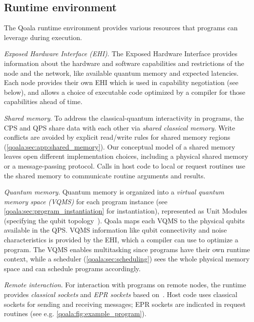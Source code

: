 \subsection{Runtime environment}
\label{qoala:sec:runtime_environment}
The Qoala runtime environment provides various resources that programs can leverage during execution.

\textit{Exposed Hardware Interface (EHI)}.
The Exposed Hardware Interface provides information about the hardware and software capabilities and restrictions of the node and the network,
like available quantum memory and expected latencies.
Each node provides their own EHI which is used in capability negotiation (see below), and allows a choice of executable code optimized by a compiler for those capabilities ahead of time. 

\textit{Shared memory}.
To address the classical-quantum interactivity in programs, the CPS and QPS share data with each other via \textit{shared classical memory}.
Write conflicts are avoided by explicit read/write rules for shared memory regions (\cref{qoala:sec:app:shared_memory}).
Our conceptual model of a shared memory leaves open different implementation choices, including a physical shared memory or a message-passing protocol.
Calls in host code to local or request routines use the shared memory to communicate routine arguments and results.

\textit{Quantum memory}.
Quantum memory is organized into a \textit{virtual quantum memory space (VQMS)} for each program instance (see \cref{qoala:sec:program_instantiation} for instantiation), represented as Unit Modules (specifying the qubit topology~\cite{dahlberg2022netqasm}).
Qoala maps each VQMS to the physical qubits available in the QPS.
VQMS information like qubit connectivity and noise characteristics is provided by the EHI, which a compiler can use to optimize a program.
The VQMS enables multitasking since programs have their own runtime context, while a scheduler (\cref{qoala:sec:scheduling}) sees the whole physical memory space and can schedule programs accordingly.

\textit{Remote interaction}. For interaction with programs on remote nodes,
the runtime provides \textit{classical sockets} and \textit{EPR sockets} based on~\cite{dahlberg2022netqasm}. Host code uses classical sockets for sending and receiving messages; EPR sockets are indicated in request routines (see e.g. \cref{qoala:fig:example_program}).

